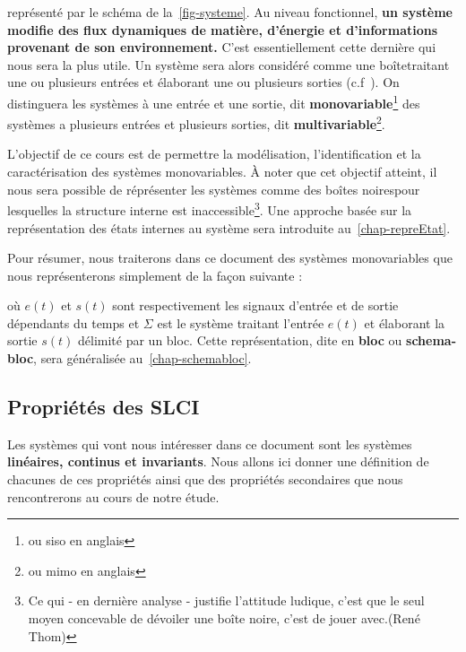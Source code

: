 représenté par le schéma de la~\cref{fig-systeme}.
Au niveau fonctionnel, \textbf{un système modifie des flux dynamiques 
de matière, d'énergie et d'informations provenant 
de son environnement.}
C'est essentiellement cette dernière qui nous sera la plus utile.
Un système sera alors considéré comme une \og boîte\fg traitant une 
ou plusieurs entrées et élaborant une ou plusieurs sorties 
(c.f~). On distinguera les systèmes à 
une entrée et une sortie, dit \textbf{monovariable}\footnote{ou \gls{siso} 
en anglais} des systèmes  a plusieurs entrées et plusieurs sorties, dit 
\textbf{multivariable}\footnote{ou \gls{mimo} en anglais}.

L'objectif de ce cours est de permettre la modélisation, 
l'identification et la caractérisation des systèmes monovariables. 
\`A noter que cet objectif atteint, il nous sera possible de réprésenter 
les systèmes comme des \og boîtes noires\fg pour lesquelles la structure 
interne est inaccessible\footnote{\og Ce qui - en dernière analyse - justifie 
l'attitude ludique, c'est que le seul moyen concevable de dévoiler une 
boîte noire, c'est de jouer avec.\fg (René Thom)}. Une approche basée 
sur la représentation des états internes au système sera 
introduite au~\cref{chap-repreEtat}. 

Pour résumer, nous traiterons dans ce document 
des systèmes monovariables que nous représenterons simplement 
de la façon suivante :
\begin{center}
    
\end{center}
où $e(t)$ et $s(t)$ sont respectivement les signaux d'entrée et de sortie 
dépendants du temps et $\Sigma$ est le système traitant l'entrée $e(t)$ et 
élaborant la sortie $s(t)$ délimité par un bloc. 
Cette représentation, dite en \textbf{bloc} ou 
\textbf{schema-bloc}, sera généralisée au~\cref{chap-schemabloc}.
\clearpage
\restoregeometry
\captionsetup{width=0.9\linewidth}
\subsection{Propriétés des SLCI}
Les systèmes qui vont nous intéresser dans ce document sont les systèmes
\textbf{linéaires, continus et invariants}. Nous allons ici donner une 
définition de chacunes de ces propriétés ainsi que des propriétés secondaires 
que nous rencontrerons au cours de notre étude.

